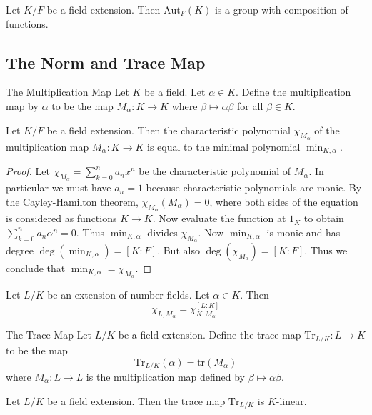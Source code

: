 \documentclass[a4paper]{article}
\begin{document}
\begin{lmm}{}{} Let $K/F$ be a field extension. Then $\text{Aut}_F(K)$ is a group with composition of functions. 
\end{lmm}

\subsection{The Norm and Trace Map}
\begin{defn}{The Multiplication Map}{} Let $K$ be a field. Let $\alpha\in K$. Define the multiplication map by $\alpha$ to be the map $M_\alpha:K\to K$ where $\beta\mapsto\alpha\beta$ for all $\beta\in K$. 
\end{defn}

\begin{prp}{}{} Let $K/F$ be a field extension. Then the characteristic polynomial $\chi_{M_\alpha}$ of the multiplication map $M_\alpha:K\to K$ is equal to the minimal polynomial $\min_{K,\alpha}$. \tcbline
\begin{proof}
Let $\chi_{M_\alpha}=\sum_{k=0}^na_nx^n$ be the characteristic polynomial of $M_\alpha$. In particular we must have $a_n=1$ because characteristic polynomials are monic. By the Cayley-Hamilton theorem, $\chi_{M_\alpha}(M_\alpha)=0$, where both sides of the equation is considered as functions $K\to K$. Now evaluate the function at $1_K$ to obtain $\sum_{k=0}^na_n\alpha^n=0$. Thus $\min_{K,\alpha}$ divides $\chi_{M_\alpha}$. Now $\min_{K,\alpha}$ is monic and has degree $\deg(\min_{K,\alpha})=[K:F]$. But also $\deg(\chi_{M_\alpha})=[K:F]$. Thus we conclude that $\min_{K,\alpha}=\chi_{M_\alpha}$. 
\end{proof}
\end{prp}

\begin{prp}{}{} Let $L/K$ be an extension of number fields. Let $\alpha\in K$. Then $$\chi_{L,M_\alpha}=\chi_{K,M_\alpha}^{[L:K]}$$
\end{prp}

\begin{defn}{The Trace Map}{} Let $L/K$ be a field extension. Define the trace map $\text{Tr}_{L/K}:L\to K$ to be the map $$\text{Tr}_{L/K}(\alpha)=\text{tr}(M_\alpha)$$ where $M_\alpha:L\to L$ is the multiplication map defined by $\beta\mapsto\alpha\beta$. 
\end{defn}

\begin{lmm}{}{} Let $L/K$ be a field extension. Then the trace map $\text{Tr}_{L/K}$ is $K$-linear. 
\end{lmm}
\end{document}
